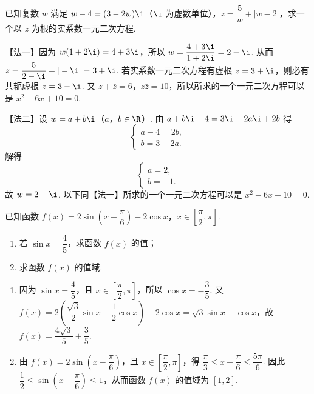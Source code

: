 \begin{problem}
已知复数 \(w\) 满足 \(w-4=(3-2w)\i\)（\(\i\) 为虚数单位），\(z=\dfrac{5}{w}+|w-2|\)，求一个以 \(z\) 为根的实系数一元二次方程.
\end{problem}

\begin{solution}
【法一】因为 \(w(1+2\i)=4+3\i\)，所以 \(w=\dfrac{4+3\i}{1+2\i}=2-\i\).
从而 \(z=\dfrac{5}{2-\i}+|-\i|=3+\i\).
若实系数一元二次方程有虚根 \(z=3+\i\)，则必有共轭虚根 \(\bar z=3-\i\). 又 \(z+\bar z=6\)，\(z\bar z=10\)，所以所求的一个一元二次方程可以是 \(x^2-6x+10=0\).

【法二】设 \(w=a+b\i\)（\(a\)，\(b\in\R\)）. 由 \(a+b\i-4=3\i-2a\i+2b\)
得
\[
\begin{cases}
a-4=2b,\\
b=3-2a.
\end{cases}
\]
解得
\[
\begin{cases}
a=2,\\
b=-1.
\end{cases}
\]
故 \(w=2-\i\). 以下同【法一】所求的一个一元二次方程可以是 \(x^2-6x+10=0\).
\end{solution}

\begin{problem}
已知函数 \(f(x)=2\sin\left(x+\dfrac{\pi}{6}\right)-2\cos x\)，\(x\in\left[\dfrac{\pi}{2},\pi\right]\).

\begin{enumerate}
\item 若 \(\sin x=\dfrac45\)，求函数 \(f(x)\) 的值；
\item 求函数 \(f(x)\) 的值域.
\end{enumerate}
\end{problem}

\begin{solution}
\begin{enumerate}
\item 因为 \(\sin x=\dfrac45\)，且 \(x\in\left[\dfrac{\pi}{2},\pi\right]\)，所以 \(\cos x=-\dfrac35\). 又 \(f(x)=2\left(\dfrac{\sqrt3}{2}\sin x+\dfrac12\cos x\right)-2\cos x=\sqrt3\sin x-\cos x\)，故 \(f(x)=\dfrac{4\sqrt3}{5}+\dfrac35\).
\item 由 \(f(x)=2\sin\left(x-\dfrac{\pi}{6}\right)\)，且 \(x\in\left[\dfrac{\pi}{2},\pi\right]\)，得 \(\dfrac{\pi}{3}\le x-\dfrac{\pi}{6}\le\dfrac{5\pi}{6}\). 因此 \(\dfrac12\le \sin\left(x-\dfrac{\pi}{6}\right)\le1\)，从而函数 \(f(x)\) 的值域为 \([1,2]\).
\end{enumerate}
\end{solution}

